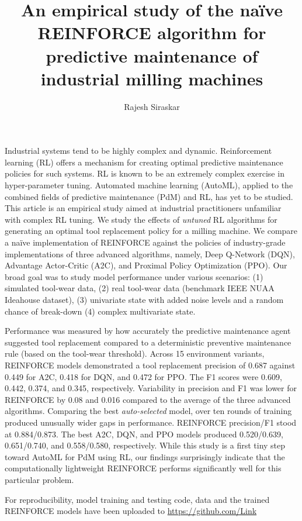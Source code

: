 \documentclass[a4paper, 12pt]{article}
\title{An empirical study of the na\"ive REINFORCE algorithm for predictive maintenance of industrial milling machines}
\author{Rajesh Siraskar}
\renewenvironment{abstract}
{\small
	\begin{center}
		\bfseries \abstractname\vspace{-.5em}\vspace{0pt}
	\end{center}
	\list{}{
		\setlength{\leftmargin}{.25cm}%
		\setlength{\rightmargin}{\leftmargin}%
	}%
	\item\relax}
{\endlist}
\begin{document}
\maketitle
\begin{abstract}
Industrial systems tend to be highly complex and dynamic. Reinforcement learning (RL) offers a mechanism for creating optimal predictive maintenance policies for such systems. RL is known to be an extremely complex exercise in hyper-parameter tuning. Automated machine learning (AutoML), applied to the combined fields of predictive maintenance (PdM) and RL, has yet to be studied. This article is an empirical study aimed at industrial practitioners unfamiliar with complex RL tuning. We study the effects of \textit{untuned} RL algorithms for generating an optimal tool replacement policy for a milling machine. We compare a na\"ive implementation of REINFORCE against the policies of industry-grade implementations of three advanced algorithms, namely, Deep Q-Network (DQN), Advantage Actor-Critic (A2C), and Proximal Policy Optimization (PPO). Our broad goal was to study model performance under various scenarios: (1) simulated tool-wear data, (2) real tool-wear data  (benchmark IEEE NUAA Ideahouse dataset), (3) univariate state with added noise levels and a random chance of break-down (4) complex multivariate state.

Performance was measured by how accurately the predictive maintenance agent suggested tool replacement compared to a deterministic preventive maintenance rule (based on the tool-wear threshold). Across 15 environment variants, REINFORCE models demonstrated a tool replacement precision of 0.687 against 0.449 for A2C, 0.418 for DQN, and 0.472 for PPO. The F1 scores were 0.609, 0.442, 0.374, and 0.345, respectively. Variability in precision and F1 was lower for REINFORCE by 0.08 and 0.016 compared to the average of the three advanced algorithms. Comparing the best \textit{auto-selected} model, over ten rounds of training produced unusually wider gaps in performance. REINFORCE precision/F1 stood at 0.884/0.873. The best A2C, DQN, and PPO models produced 0.520/0.639, 0.651/0.740, and 0.558/0.580, respectively. While this study is a first tiny step toward AutoML for PdM using RL, our findings surprisingly indicate that the computationally lightweight REINFORCE performs significantly well for this particular problem.

For reproducibility, model training and testing code, data and the trained REINFORCE models have been uploaded to \href{https://github.com/Rajesh-Siraskar/Empirical-Study\_REINFORCE-for-predictive-maintenance}{https://github.com/Link} 
\end{abstract}
\end{document}
